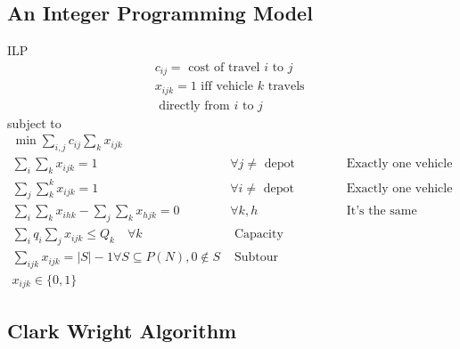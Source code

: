 \subsection{An Integer Programming Model}

ILP
$$
\begin{array}{r}
c_{i j}=\text { cost of travel } i \text { to } j \\
x_{i j k}=1 \text { iff vehicle } k \text { travels } \\
\text { directly from } i \text { to } j
\end{array}
$$
subject to
$$
\begin{array}{cll}
\min \sum_{i,j} c_{ij} \sum_k x_{ijk}\\
\sum_{i} \sum_{k} x_{i j k}=1 & \forall j \neq \text { depot } & \text { Exactly one vehicle in } \\
\sum_{j} \sum_{k}^{k} x_{i j k}=1 & \forall i \neq \text { depot } & \text { Exactly one vehicle out } \\
\sum_{i} \sum_{k} x_{i h k}-\sum_{j} \sum_{k} x_{h j k}=0 & \forall k, h & \text { It's the same vehicle } \\
\sum_{i} q_{i} \sum_{j} x_{i j k} \leq Q_{k} \quad \forall k & \text { Capacity constraint } \\
\sum_{i j k} x_{i j k}=|S|-1 \forall S \subseteq P(N), 0 \notin S & \text { Subtour elimination } \\
x_{i j k} \in\{0,1\} &
\end{array}
$$

\subsection{Clark Wright Algorithm}

